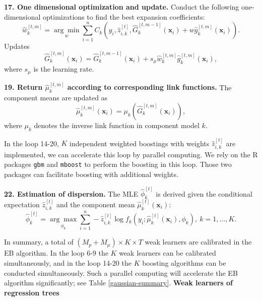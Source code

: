 \documentclass[11pt]{article}
\numberwithin{equation}{section}
\def\bx{\boldsymbol{x}}
\begin{document}
{\bf 17. One dimensional optimization and update.}	
	Conduct the following one-dimensional optimizations to find the best expansion coefficients:
		$$\hat{w}_{k}^{[t,m]}=\underset{w}{\arg\min}\sum_{i=1}^n C_{k}(y_i,\hat{z}_{i,k}^{[t]},\hat{G}_k^{[t,m-1]}(\bx_i)+w\hat{g}_k^{[t,m]}(\bx_i)).$$
		Updates
		$$\hat{G}_k^{[t,m]}(\bx_i)=\hat{G}_k^{[t,m-1]}(\bx_i)+s_\mu\hat{w}_{k}^{[t,m]}\hat{g}_{k}^{[t,m]}(\bx_i),$$
		where $s_\mu$ is the learning rate.

{\bf 19. Return $\hat{\mu}_k^{[t,m]}$ according to corresponding link functions.} The component means are updated as
		$$\hat{\mu}_k^{[t,m]}(\bx_i)=\mu_k(\hat{G}_k^{[t,m]}(\bx_i)),$$
		where $\mu_k$ denotes the inverse link function in component model $k$.

In the loop 14-20, $K$ independent weighted boostings with weights $\hat{z}_{i,k}^{[t]}$ are implemented, we can accelerate this loop  by parallel computing.
We rely on the R packages {\tt gbm} and {\tt mboost} to perform the boosting in this loop. 
Those two packages can facilitate boosting with additional weights.


{\bf 22. Estimation of dispersion.} 
The MLE $\hat{\phi}_k^{[t]}$ is derived given the conditional expectation $\hat{z}_{i,k}^{[t]}$ and the component mean $\hat{\mu}_k^{[t]}(\bx_i)$:
\begin{equation}
		\hat{\phi}_k^{[t]}=\underset{\phi_k}{\arg\max} \sum_{i=1}^n-\hat{z}_{i,k}^{[t]}\log f_k(y_i;\hat{\mu}_k^{[t]}(\bx_i),\phi_k), ~ k=1,\ldots,K.
\end{equation}

In summary, a total of $(M_p+M_\mu)\times K\times T$ weak learners are calibrated in the EB algorithm. 
In the loop 6-9  the $K$ weak learners can be calibrated simultaneously, 
and in the loop 14-20 the $K$ boosting algorithms can be conducted simultaneously. 
Such a parallel computing will accelerate the EB algorithm significantly; see Table \ref{gaussian-summary}.
{\bf \color{blue} Weak learners of regression trees}
\end{document}
